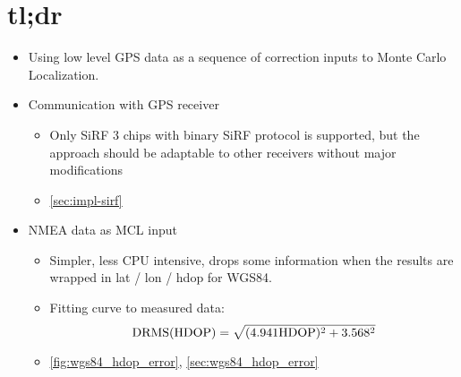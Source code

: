 \chapter{tl;dr}

\begin{itemize}
\item
Using low level GPS data as a sequence of correction inputs to Monte Carlo Localization.

\item
Communication with GPS receiver
\begin{itemize}
    \item Only SiRF 3 chips with binary SiRF protocol is supported, but the
    approach should be adaptable to other receivers without major modifications
    \item \autoref{sec:impl-sirf}
\end{itemize}

\item
NMEA data as MCL input
\begin{itemize}
    \item Simpler, less CPU intensive, drops some information when the results are
    wrapped in lat / lon / hdop for WGS84.
    \item
        Fitting curve to measured data:
        \begin{equation*}
            \mathrm{DRMS}(\mathrm{HDOP}) = \sqrt{(\num{4.941}\mathrm{HDOP})^2 + \num{3.568}^2}
        \end{equation*}
    \item \autoref{fig:wgs84_hdop_error}, \autoref{sec:wgs84_hdop_error}
\end{itemize}

\end{itemize}
